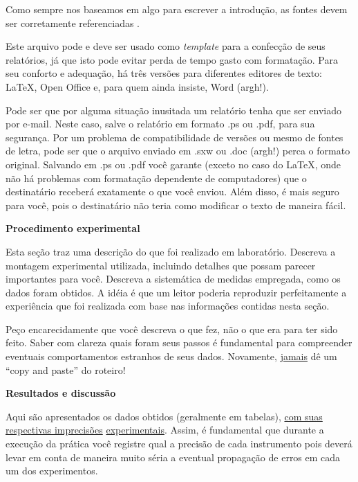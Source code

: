 \documentclass[twocolumn]{article}
\newcommand{\2}{\hspace{5mm}}
\newcommand{\5}{\vspace{5mm}}
\newcommand{\7}{\vspace{7mm}}
\begin{document}
\2 Como sempre nos baseamos em algo para escrever a introdu\c{c}\~ao, 
as fontes devem ser corretamente referenciadas \cite{moyses}. 

\2 Este arquivo pode e deve ser usado como {\it template} para a 
confec\c{c}\~ao de seus relat\'orios, j\'a que isto pode evitar perda 
de tempo gasto com formata\c{c}\~ao. Para seu conforto e 
adequa\c{c}\~ao, h\'a tr\^es vers\~oes para diferentes editores de 
texto: \LaTeX, Open Office e, para quem ainda insiste, Word (argh!). 

\2 Pode ser que por alguma situa\c{c}\~ao inusitada um relat\'orio 
tenha que ser enviado por e-mail. Neste caso, salve o relat\'orio em 
formato .ps ou .pdf, para sua seguran\c{c}a. Por um problema de 
compatibilidade de vers\~oes ou mesmo de fontes de letra, pode ser que 
o arquivo enviado em .sxw ou .doc (argh!) perca o formato original. 
Salvando em .ps ou .pdf voc\^e garante (exceto no caso do \LaTeX, onde 
n\~ao h\'a problemas com formata\c{c}\~ao dependente de computadores) 
que o destinat\'ario receber\'a exatamente o que voc\^e enviou. Al\'em 
disso, \'e mais seguro para voc\^e, pois o destinat\'ario n\~ao teria 
como modificar o texto de maneira f\'acil.

\newpage

{\bf Procedimento experimental}

\5 

\2 Esta se\c{c}\~ao traz uma descri\c{c}\~ao do que foi realizado em 
laborat\'orio. Descreva a montagem experimental utilizada, incluindo 
detalhes que possam parecer importantes para voc\^e. Descreva a 
sistem\'atica de medidas empregada, como os dados foram obtidos. A 
id\'eia \'e que um leitor poderia reproduzir perfeitamente a 
experi\^encia que foi realizada com base nas informa\c{c}\~oes 
contidas nesta se\c{c}\~ao.

\2 Pe\c{c}o encarecidamente que voc\^e descreva o que fez, n\~ao o que 
era para ter sido feito. Saber com clareza quais foram seus passos \'e 
fundamental para compreender eventuais comportamentos estranhos de seus 
dados. Novamente, \underline{jamais} d\^e um ``copy and paste'' do roteiro!

\7

{\bf Resultados e discuss\~ao}

\5 

\2 Aqui s\~ao apresentados os dados obtidos (geralmente em tabelas), 
\underline{com suas respectivas imprecis\~oes} \underline{experimentais}. 
Assim, \'e fundamental que durante a execu\c{c}\~ao da pr\'atica voc\^e 
registre qual a precis\~ao de cada instrumento pois dever\'a levar em conta 
de maneira muito s\'eria a eventual propaga\c{c}\~ao de erros em cada um 
dos experimentos. 
\end{document}
